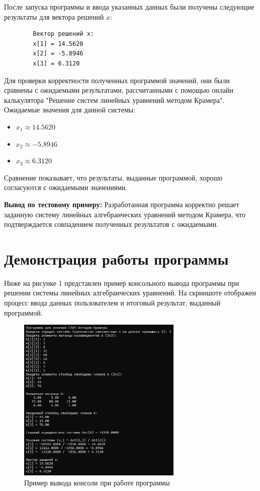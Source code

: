 \documentclass[12pt,a4paper]{scrartcl}
\begin{document}
	\vspace{1ex} 
	
	После запуска программы и ввода указанных данных были получены следующие результаты для вектора решений $x$:
	\begin{verbatim}
		Вектор решений x:
		x[1] = 14.5620
		x[2] = -5.8946
		x[3] = 6.3120
	\end{verbatim}
	
	Для проверки корректности полученных программой значений, они были сравнены с ожидаемыми результатами, рассчитанными с помощью онлайн калькулятора "Решение систем линейных уравнений методом Крамера". Ожидаемые значения для данной системы:
	\begin{itemize}
		\item $x_1 \approx 14.5620$
		\item $x_2 \approx -5.8946$
		\item $x_3 \approx 6.3120$
	\end{itemize}
	
	Сравнение показывает, что результаты, выданные программой, хорошо согласуются с ожидаемыми значениями.
	
	\textbf{Вывод по тестовому примеру:} Разработанная программа корректно решает заданную систему линейных алгебраических уравнений методом Крамера, что подтверждается совпадением полученных результатов с ожидаемыми.
	
	\newpage
	
	\section{Демонстрация работы программы} 
	
	Ниже на рисунке 1 представлен пример консольного вывода программы при решении системы линейных алгебраических уравнений. На скриншоте отображен процесс ввода данных пользователем и итоговый результат, выданный программой.
	
	\begin{figure}[h!]
		\centering
		\includegraphics[width=0.7\textwidth]{Демонстрация работы программы.png}
		\caption{Пример вывода консоли при работе программы}
	\end{figure}
	
\end{document}
